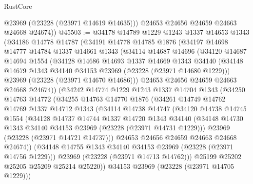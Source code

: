 \begin{lexlean}{RustCore}
\begin{coremodule}
          @23969
          (@23228 (@23971 @14619 @14635)))
        @24653
        @24656
        @24659
        @24663
        @24668
        @24674))
@45503 := @34178
    @14789
    @1229
    @1243
    @1337
    @14653
    @1343
    (@34186
      @14778
      @14787
      (@34191
        @14778
        @14785
        @1876
        (@34197
          @14698
          @14777
          @14784
          @1337
          @14661
          @1343
          (@34114
            @14687
            @14696
            (@34120
              @14687
              @14694
              @1554
              (@34128
                @14686
                @14693
                @1337
                @14669
                @1343
                @34140
                (@34148 @14679 @1343 @34140 @34153 @23969 (@23228 (@23971 @14680 @1229)))
                @23969
                (@23228 (@23971 @14670 @14686)))
              @24653
              @24656
              @24659
              @24663
              @24668
              @24674))
          (@34242
            @14774
            @1229
            @1243
            @1337
            @14704
            @1343
            (@34250
              @14763
              @14772
              (@34255
                @14763
                @14770
                @1876
                (@34261
                  @14749
                  @14762
                  @14769
                  @1337
                  @14712
                  @1343
                  (@34114
                    @14738
                    @14747
                    (@34120
                      @14738
                      @14745
                      @1554
                      (@34128
                        @14737
                        @14744
                        @1337
                        @14720
                        @1343
                        @34140
                        (@34148 @14730 @1343 @34140 @34153 @23969 (@23228 (@23971 @14731 @1229)))
                        @23969
                        (@23228 (@23971 @14721 @14737)))
                      @24653
                      @24656
                      @24659
                      @24663
                      @24668
                      @24674))
                  (@34148 @14755 @1343 @34140 @34153 @23969 (@23228 (@23971 @14756 @1229)))
                  @23969
                  (@23228 (@23971 @14713 @14762)))
                @25199
                @25202
                @25205
                @25209
                @25214
                @25220))
            @34153
            @23969
            (@23228 (@23971 @14705 @1229)))

\end{coremodule}
\end{lexlean}
